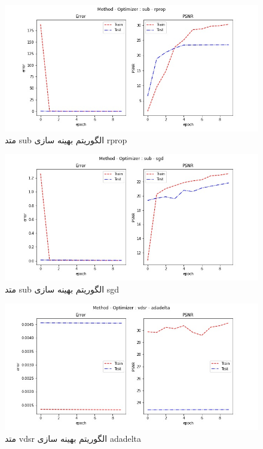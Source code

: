  \begin{figure}[!h] 
       \centering 
       \includegraphics[width=160mm]{./chapter3/images/error-psnr-sub-rprop.jpg}
       \caption{متد sub الگوریتم بهینه سازی rprop}
       \label{fig:error-psnr-sub-rprop}
 \end{figure}
 \begin{figure}[!h] 
       \centering 
       \includegraphics[width=160mm]{./chapter3/images/error-psnr-sub-sgd.jpg}
       \caption{متد sub الگوریتم بهینه سازی sgd}
       \label{fig:error-psnr-sub-sgd}
 \end{figure}
 \begin{figure}[!h] 
       \centering 
       \includegraphics[width=160mm]{./chapter3/images/error-psnr-vdsr-adadelta.jpg}
       \caption{متد vdsr الگوریتم بهینه سازی adadelta}
       \label{fig:error-psnr-vdsr-adadelta}
 \end{figure}
